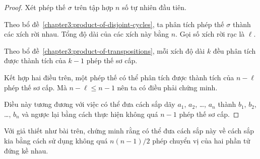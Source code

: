 \begin{proof}
    Xét phép thế $\sigma$ trên tập hợp $n$ số tự nhiên đầu tiên.
    
    Theo bổ đề~\ref{chapter3:product-of-disjoint-cycles}, ta phân tích phép thế $\sigma$ thành các xích rời nhau. Tổng độ dài của các xích này bằng $n$. Gọi số xích rời rạc là $\ell$.
    
    Theo bổ đề~\ref{chapter3:product-of-transpositions}, mỗi xích độ dài $k$ đều phân tích được thành tích của $k-1$ phép thế sơ cấp.
    
    Kết hợp hai điều trên, một phép thế có thể phân tích được thành tích của $n - \ell$ phép thế sơ cấp. Mà $n - \ell \le n - 1$ nên ta có điều phải chứng minh.
    
    Điều này tương đương với việc có thể đưa cách sắp dãy $a_{1}$, $a_{2}$, \ldots, $a_{n}$ thành $b_{1}$, $b_{2}$, \ldots, $b_{n}$ và ngược lại bằng cách thực hiện không quá $n - 1$ phép thế sơ cấp.
\end{proof}

\begin{exercise}
    Với giả thiết như bài trên, chứng minh rằng có thể đưa cách sắp này về cách sắp kia bằng cách sử dụng không quá $n(n-1)/2$ phép chuyển vị của hai phần tử đứng kề nhau.
\end{exercise}

